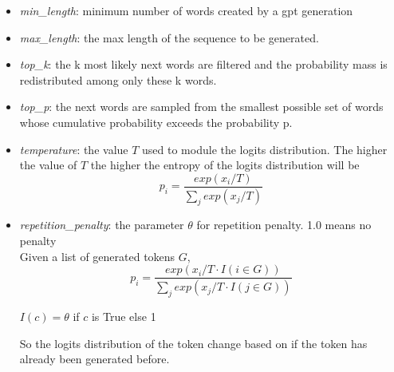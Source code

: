 \documentclass{article}
\begin{document}
\begin{itemize}
    \item \textit{min\_length}: minimum number of words created by a gpt generation
    \item \textit{max\_length}: the max length of the sequence to be generated.  
    \item \textit{top\_k}: the k most likely next words are filtered and the probability mass is redistributed among only these k words.
    
    \item \textit{top\_p}: the next words are sampled from the smallest possible set of words whose cumulative probability exceeds the probability p.
    \item \textit{temperature}: the value $T$ used to module the logits distribution. The higher the value of $T$ the higher the entropy of the logits distribution will be
    \begin{equation}
        p_i = \frac{exp(x_i/T)}{\sum_j exp(x_j/T)}   
    \end{equation}
    \item \textit{repetition\_penalty}: the parameter $\theta$ for repetition penalty. 1.0 means no penalty \\
    Given a list of generated tokens $G$, 
     \begin{equation}
        p_i = \frac{exp(x_i/T \cdot I(i \in G))}{\sum_j exp(x_j/T \cdot I(j \in G))}
    \end{equation}
    \begin{center}
    $I(c) = \theta$ if $c$ is True else 1
    \end{center}

    So the logits distribution of the token change based on if the token has already been generated before.


\end{itemize}
\end{document}

